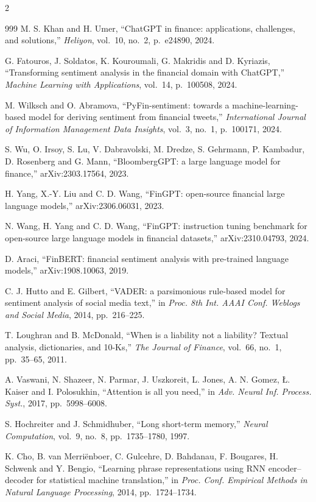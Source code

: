 \begin{footnotesize}
\begin{multicols}{2}
\begin{thebibliography}{999}
 M. S. Khan and H. Umer, ``ChatGPT in finance: applications,
challenges, and solutions,'' \emph{Heliyon}, vol.~10, no.~2, p.~e24890, 2024.

 G. Fatouros, J. Soldatos, K. Kouroumali, G. Makridis and D. Kyriazis,
``Transforming sentiment analysis in the financial domain with ChatGPT,'' \emph{Machine
Learning with Applications}, vol.~14, p.~100508, 2024.

 M. Wilksch and O. Abramova, ``PyFin-sentiment: towards a
machine-learning-based model for deriving sentiment from financial tweets,''
\emph{International Journal of Information Management Data Insights}, vol.~3, no.~1,
p.~100171, 2024.

 S. Wu, O. Irsoy, S. Lu, V. Dabravolski, M. Dredze, S. Gehrmann,
P. Kambadur, D. Rosenberg and G. Mann, ``BloombergGPT: a large language model for finance,''
arXiv:2303.17564, 2023.

 H. Yang, X.-Y. Liu and C. D. Wang, ``FinGPT: open-source financial
large language models,'' arXiv:2306.06031, 2023.

 N. Wang, H. Yang and C. D. Wang, ``FinGPT: instruction tuning
benchmark for open-source large language models in financial datasets,'' arXiv:2310.04793,
2024.

 D. Araci, ``FinBERT: financial sentiment analysis with pre-trained
language models,'' arXiv:1908.10063, 2019.

 C. J. Hutto and E. Gilbert, ``VADER: a parsimonious rule-based model for
sentiment analysis of social media text,'' in \emph{Proc. 8th Int. AAAI Conf. Weblogs and
Social Media}, 2014, pp.~216--225.

 T. Loughran and B. McDonald, ``When is a liability not a liability?
Textual analysis, dictionaries, and 10-Ks,'' \emph{The Journal of Finance}, vol.~66, no.~1,
pp.~35--65, 2011.

 A. Vaswani, N. Shazeer, N. Parmar, J. Uszkoreit, L. Jones, A. N. Gomez,
{\L}. Kaiser and I. Polosukhin, ``Attention is all you need,'' in \emph{Adv. Neural Inf.
Process. Syst.}, 2017, pp.~5998--6008.

 S. Hochreiter and J. Schmidhuber, ``Long short-term memory,''
\emph{Neural Computation}, vol.~9, no.~8, pp.~1735--1780, 1997.

 K. Cho, B. van Merri\"enboer, C. Gulcehre, D. Bahdanau, F. Bougares,
H. Schwenk and Y. Bengio, ``Learning phrase representations using RNN encoder--decoder for
statistical machine translation,'' in \emph{Proc. Conf. Empirical Methods in Natural Language
Processing}, 2014, pp.~1724--1734.


\end{thebibliography}
\end{multicols}
\end{footnotesize}
